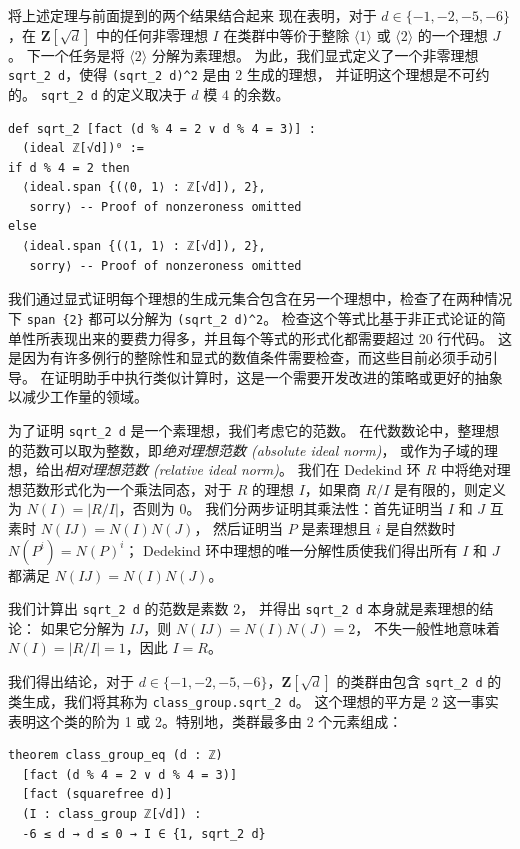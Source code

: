 \documentclass[sigplan,10pt,nonacm,
screen]{acmart} \settopmatter{printfolios=true,printccs=false,printacmref=false}
\newcommand{\ZZ}{\mathbf{Z}}
\begin{document}
将上述定理与前面提到的两个结果结合起来
现在表明，对于 $d\in \{-1,-2,-5,-6\}$，在 $\ZZ[\sqrt{d}]$ 中的任何非零理想 $I$ 在类群中等价于整除 $\langle 1 \rangle$ 或 $\langle 2 \rangle$ 的一个理想 $J$。
下一个任务是将 $\langle 2 \rangle$ 分解为素理想。
为此，我们显式定义了一个非零理想 \lstinline{sqrt_2 d}，使得 \lstinline!(sqrt_2 d)^2! 是由 $2$ 生成的理想，
并证明这个理想是不可约的。
\lstinline{sqrt_2 d} 的定义取决于 $d$ 模 $4$ 的余数。
\begin{lstlisting}
def sqrt_2 [fact (d % 4 = 2 ∨ d % 4 = 3)] :
  (ideal ℤ[√d])⁰ :=
if d % 4 = 2 then
  ⟨ideal.span {(⟨0, 1⟩ : ℤ[√d]), 2},
   sorry⟩ -- Proof of nonzeroness omitted
else
  ⟨ideal.span {(⟨1, 1⟩ : ℤ[√d]), 2},
   sorry⟩ -- Proof of nonzeroness omitted
\end{lstlisting}
我们通过显式证明每个理想的生成元集合包含在另一个理想中，检查了在两种情况下 \lstinline!span {2}! 都可以分解为 \lstinline{(sqrt_2 d)^2}。
检查这个等式比基于非正式论证的简单性所表现出来的要费力得多，并且每个等式的形式化都需要超过 20 行代码。
这是因为有许多例行的整除性和显式的数值条件需要检查，而这些目前必须手动引导。
在证明助手中执行类似计算时，这是一个需要开发改进的策略或更好的抽象以减少工作量的领域。

为了证明 \lstinline{sqrt_2 d} 是一个素理想，我们考虑它的范数。
在代数数论中，整理想的范数可以取为整数，即\emph{绝对理想范数 (absolute ideal norm)}，
或作为子域的理想，给出\emph{相对理想范数 (relative ideal norm)}。
我们在 Dedekind 环 $R$ 中将绝对理想范数形式化为一个乘法同态，对于 $R$ 的理想 $I$，如果商 $R/I$ 是有限的，则定义为 $N(I) = \left|R / I\right|$，否则为 $0$。
我们分两步证明其乘法性：首先证明当 $I$ 和 $J$ 互素时 $N(IJ) = N(I) N(J)$，
然后证明当 $P$ 是素理想且 $i$ 是自然数时 $N(P^i) = N(P)^i$；
Dedekind 环中理想的唯一分解性质使我们得出所有 $I$ 和 $J$ 都满足 $N(IJ) = N(I) N(J)$。

我们计算出 \lstinline{sqrt_2 d} 的范数是素数 $2$，
并得出 \lstinline{sqrt_2 d} 本身就是素理想的结论：
如果它分解为 $IJ$，则 $N(IJ) = N(I) N(J) = 2$，
不失一般性地意味着 $N(I) = |R/I| = 1$，因此 $I = R$。

我们得出结论，对于 $d\in \{-1,-2,-5,-6\}$，$\ZZ[\sqrt{d}]$ 的类群由包含 \lstinline{sqrt_2 d} 的类生成，我们将其称为 \lstinline{class_group.sqrt_2 d}。
这个理想的平方是 2 这一事实表明这个类的阶为 1 或 2。特别地，类群最多由 2 个元素组成：
\begin{lstlisting}
theorem class_group_eq (d : ℤ)
  [fact (d % 4 = 2 ∨ d % 4 = 3)]
  [fact (squarefree d)]
  (I : class_group ℤ[√d]) :
  -6 ≤ d → d ≤ 0 → I ∈ {1, sqrt_2 d}
\end{lstlisting}
\end{document}

